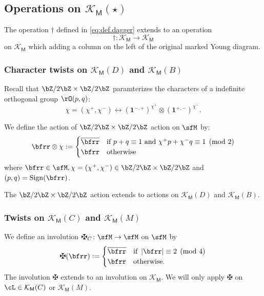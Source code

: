 \documentclass[12pt,a4paper]{amsart}
\def\KM{{\mathcal{K_{\mathsf{M}}}}}
\newcommand{\bfone}{\mathbf{1}}
\def\abs#1{\left|{#1}\right|}
\numberwithin{equation}{section}
\theoremstyle{remark}
\def\ssign{\mathrm{Sign}}
\let\ytb=\ytableaushort
\newcommand{\tytb}[1]{{\tiny\ytb{#1}}}
\def\umm{{=}}
\def\upp{{\ast}}
\def\upp{
  {{\setbox0\hbox{$\times$}
      \rlap{\hbox to \wd0{\hss$+$\hss}}\box0
    }}
}
\begin{document}
\subsection{Operations on $\KM(\star)$}
\def\npp{\#_{+}}
\def\nmm{\#_{-}}


The operation $\dagger$ defined in \eqref{eq:def.dagger} extends to an operation
\[
  \dagger \colon \KM\longrightarrow \KM
\]
on $\KM$ which adding a column on the left of the original marked Young diagram.


\subsubsection{Character twists on $\KM(D)$ and $\KM(B)$}
\label{sec:tchar.DB}
Recall that  $\bZ/2\bZ\times \bZ/2\bZ$ paramterizes
the characters of a indefinite orthogonal group $\rO(p,q)$:
\[
  \chi=(\chi^{+},\chi^{-})\longleftrightarrow (\bfone^{-,+})^{\chi^{+}}\otimes (\bfone^{+,-})^{\chi^{-}}.
\]

We define the action of $\bZ/2\bZ \times \bZ/2\bZ$ action on $\sfM$ by:
\[
  \bfrr \otimes \chi := \begin{cases}
    \overline{\bfrr} & \text{if } p+q \equiv 1 \text{ and }\chi^{+}p + \chi^{-} q\equiv 1 \pmod{2}\\
    \bfrr & \text{otherwise}%
  \end{cases}
\]
where $\bfrr\in \sfM, \chi=(\chi^{+},\chi^{-}) \in \bZ/2\bZ\times \bZ/2\bZ$ and
$(p,q)=\ssign(\bfrr)$.

The $\bZ/2\bZ\times \bZ/2\bZ$ action extends to actions on $\KM(D)$ and $\KM(B)$.




\subsubsection{Twists on $\KM(C)$ and $\KM(M)$}
We define an involution $\maltese_{C} \colon \sfM\rightarrow \sfM$ on $\sfM$ by
\[
  \maltese(\bfrr):= \begin{cases}
    \overline{\bfrr} & \text{if } \abs{\bfrr} \equiv 2 \pmod{4}\\
    \bfrr & \text{otherwise}.
  \end{cases}
\]
The involution $\maltese$ extends to an involution on $\KM$.%
We will only apply $\maltese$ on $\cL\in \KM(C)$ or $\KM(M)$.
\end{document}
